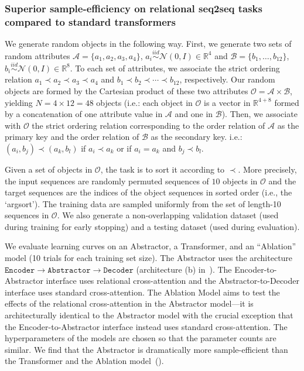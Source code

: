 \subsubsection{Superior sample-efficiency on relational seq2seq tasks compared to standard transformers}\label{sssec:exp_object_sorting_sample_efficiency}

We generate random objects in the following way. First, we generate two sets of random attributes $\mathcal{A} = \{a_1, a_2, a_3, a_4\}$, $a_i \overset{iid}{\sim} \mathcal{N}(0, I) \in \mathbb{R}^{4}$ and $\mathcal{B} = \{b_1, \ldots, b_{12}\}$, $b_i \overset{iid}{\sim} \mathcal{N}(0, I) \in \mathbb{R}^{8}$. To each set of attributes, we associate the strict ordering relation $a_1 \prec a_2 \prec a_3 \prec a_4$ and $b_1 \prec b_2 \prec \cdots \prec b_{12}$, respectively. Our random objects are formed by the Cartesian product of these two attributes $\mathcal{O} = \mathcal{A} \times \mathcal{B}$, yielding $N = 4 \times 12 = 48$ objects (i.e.: each object in $\mathcal{O}$ is a vector in $\mathbb{R}^{4+8}$ formed by a concatenation of one attribute value in $\mathcal{A}$ and one in $\mathcal{B}$). Then, we associate with $\mathcal{O}$ the strict ordering relation corresponding to the order relation of $\mathcal{A}$ as the primary key and the order relation of $\mathcal{B}$ as the secondary key. i.e.: $(a_i, b_j) \prec (a_k, b_l)$ if $a_i \prec a_k$ or if $a_i = a_k$ and $b_j \prec b_l$.

Given a set of objects in $\mathcal{O}$, the task is to sort it according to $\prec$. More precisely, the input sequences are randomly permuted sequences of $10$ objects in $\mathcal{O}$ and the target sequences are the indices of the object sequences in sorted order (i.e., the `argsort'). The training data are sampled uniformly from the set of length-10 sequences in $\mathcal{O}$. We also generate a non-overlapping validation dataset (used during training for early stopping) and a testing dataset (used during evaluation).

We evaluate learning curves on an Abstractor, a Transformer, and an ``Ablation'' model (10 trials for each training set size). The Abstractor uses the architecture $\texttt{Encoder} \to \texttt{Abstractor} \to \texttt{Decoder}$ (architecture (b) in~). The Encoder-to-Abstractor interface uses relational cross-attention and the Abstractor-to-Decoder interface uses standard cross-attention. The Ablation Model aims to test the effects of the relational cross-attention in the Abstractor model---it is architecturally identical to the Abstractor model with the crucial exception that the Encoder-to-Abstractor interface instead uses standard cross-attention. The hyperparameters of the models are chosen so that the parameter counts are similar. %
We find that the Abstractor is dramatically more sample-efficient than the Transformer and the Ablation model~().

